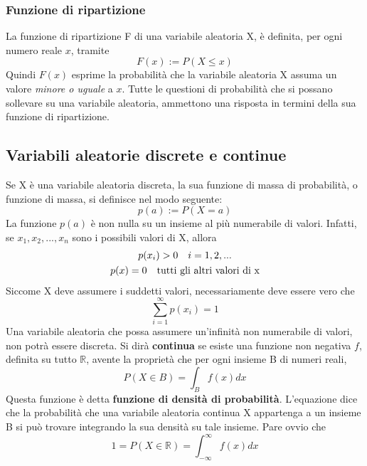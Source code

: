 \documentclass[11pt]{article}
\begin{document}
\subsubsection{Funzione di ripartizione}
La funzione di ripartizione F di una variabile aleatoria X, è definita, per ogni numero reale $x$, tramite
\begin{displaymath}
    F(x) := P(X\le x)
\end{displaymath}
Quindi $F(x)$ esprime la probabilità che la variabile aleatoria X assuma un valore \textit{minore o uguale} a $x$. Tutte le questioni di probabilità che si possano sollevare su una variabile aleatoria, ammettono una risposta in termini della sua funzione di ripartizione.
\subsection{Variabili aleatorie discrete e continue}
Se X è una variabile aleatoria discreta, la sua funzione di massa di probabilità, o funzione di massa, si definisce nel modo seguente:
\begin{displaymath}
    p(a) :=P(X=a)
\end{displaymath}
La funzione $p(a)$ è non nulla su un insieme al più numerabile di valori. Infatti, se $x_1,x_2,...,x_n$ sono i possibili valori di X, allora
\begin{gather*}
    p(x_i) > 0 \hspace{10px}i=1,2,...\\
    p(x) = 0 \hspace{10px}\mbox{tutti gli altri valori di x}
\end{gather*}
Siccome X deve assumere i suddetti valori, necessariamente deve essere vero che
\begin{displaymath}
    \sum_{i=1}^\infty p(x_i) = 1
\end{displaymath}
Una variabile aleatoria che possa assumere un'infinità non numerabile di valori, non potrà essere discreta. Si dirà \textbf{continua} se esiste una funzione non negativa $f$, definita su tutto $\mathbb{R}$, avente la proprietà che per ogni insieme B di numeri reali,
\begin{displaymath}
    P(X\in B) = \int_B f(x) dx
\end{displaymath}
Questa funzione è detta \textbf{funzione di densità di probabilità}. L'equazione dice che la probabilità che una variabile aleatoria continua X appartenga a un insieme B si può trovare integrando la sua densità su tale insieme. Pare ovvio che
\begin{displaymath}
    1=P(X\in \mathbb{R}) = \int_{-\infty}^{\infty} f(x)dx
\end{displaymath}
\end{document}
